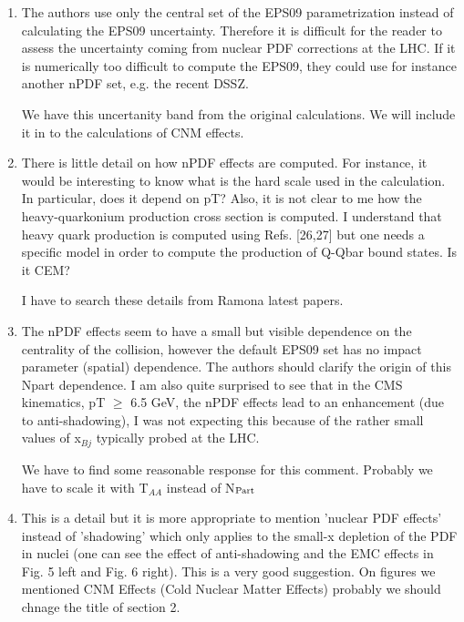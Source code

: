 \documentclass[aps,prc,preprint,superscriptaddress,showpacs,showkeys]{revtex4-1}
\begin{document}
\begin{enumerate}
\item { \color{red} The authors use only the central set of the EPS09 parametrization
instead of calculating the EPS09 uncertainty. Therefore it is
difficult for the reader to assess the uncertainty coming from nuclear
PDF corrections at the LHC. If it is numerically too difficult to
compute the EPS09, they could use for instance another nPDF set, e.g.
the recent DSSZ.}

{\color{blue} We have this uncertanity band from the original calculations. 
We will include it in to the calculations of CNM effects.} 

\item { \color{red} There is little detail on how nPDF effects are computed. For
instance, it would be interesting to know what is the hard scale used
in the calculation. In particular, does it depend on pT? Also, it is
not clear to me how the heavy-quarkonium production cross section is
computed. I understand that heavy quark production is computed using
Refs. [26,27] but one needs a specific model in order to compute the
production of Q-Qbar bound states. Is it CEM?}

{\color{blue} I have to search these details from Ramona latest papers.} 


\item { \color{red} The nPDF effects seem to have a small but visible dependence on the
centrality of the collision, however the default EPS09 set has no
impact parameter (spatial) dependence. The authors should clarify the
origin of this Npart dependence. I am also quite surprised to see that
in the CMS kinematics, pT $\geq$ 6.5 GeV, the nPDF effects lead to an
enhancement (due to anti-shadowing), I was not expecting this because
of the rather small values of x$_{Bj}$ typically probed at the LHC.}

{\color{blue} We have to find some reasonable response for this comment. Probably we have to scale it
with T$_{AA}$ instead of N$_{\rm Part}$}


\item { \color{red} This is a detail but it is more appropriate to mention 'nuclear PDF
effects' instead of 'shadowing' which only applies to the small-x
depletion of the PDF in nuclei (one can see the effect of
anti-shadowing and the EMC effects in Fig. 5 left and Fig. 6 right).}
{\color{blue} This is a very good suggestion. On figures we mentioned CNM Effects (Cold
Nuclear Matter Effects) probably we should chnage the title of section 2. }

\end{enumerate}
\end{document}
